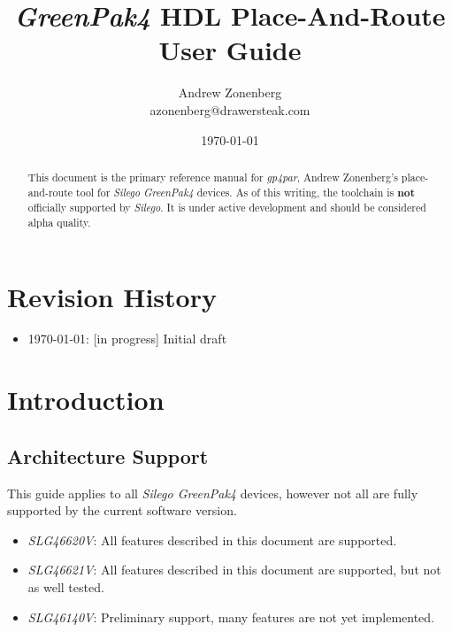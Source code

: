 \documentclass[11pt]{article}
\renewcommand\emph\textbf
\newcommand{\namestyle}[1]{\textit{#1}}
\begin{document}
\title{\vspace*{\fill}\namestyle{GreenPak4} HDL Place-And-Route User Guide}
\author{Andrew Zonenberg\\
azonenberg@drawersteak.com}
\date{\today}

\maketitle
\begin{abstract}
\normalsize This document is the primary reference manual for \namestyle{gp4par}, Andrew Zonenberg's place-and-route
tool for \namestyle{Silego GreenPak4} devices. As of this writing, the toolchain is \emph{not} officially supported by
\namestyle{Silego}. It is under active development and should be considered alpha quality.\vspace*{\fill}
\end{abstract}
\thispagestyle{empty}

\pagebreak

\tableofcontents

\pagebreak
\section{Revision History}
\begin{itemize}
\item \today: [in progress] Initial draft
\end{itemize}

\pagebreak
\section{Introduction}

\subsection{Architecture Support}
This guide applies to all \namestyle{Silego GreenPak4} devices, however not all are fully supported by the current
software version.

\begin{itemize}
\item \namestyle{SLG46620V}: All features described in this document are supported.
\item \namestyle{SLG46621V}: All features described in this document are supported, but not as well tested.
\item \namestyle{SLG46140V}: Preliminary support, many features are not yet implemented.
\end{itemize}
\end{document}
